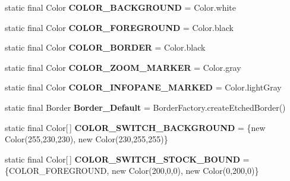 \begin{DoxyCompactItemize}
\item 
static final Color {\bfseries C\-O\-L\-O\-R\-\_\-\-B\-A\-C\-K\-G\-R\-O\-U\-N\-D} = Color.\-white\label{interfacedesmoj_1_1extensions_1_1visualization2d_1_1engine_1_1model_grafic_1_1_grafic_ad2f935939abb177571d67801b26e8671}

\item 
static final Color {\bfseries C\-O\-L\-O\-R\-\_\-\-F\-O\-R\-E\-G\-R\-O\-U\-N\-D} = Color.\-black\label{interfacedesmoj_1_1extensions_1_1visualization2d_1_1engine_1_1model_grafic_1_1_grafic_a8a833565800cb5fa563283c049878763}

\item 
static final Color {\bfseries C\-O\-L\-O\-R\-\_\-\-B\-O\-R\-D\-E\-R} = Color.\-black\label{interfacedesmoj_1_1extensions_1_1visualization2d_1_1engine_1_1model_grafic_1_1_grafic_a5faee3889bc3d33f01b81112f79fd501}

\item 
static final Color {\bfseries C\-O\-L\-O\-R\-\_\-\-Z\-O\-O\-M\-\_\-\-M\-A\-R\-K\-E\-R} = Color.\-gray\label{interfacedesmoj_1_1extensions_1_1visualization2d_1_1engine_1_1model_grafic_1_1_grafic_ac9358ec23ddfdf8512d9bb0e6d695037}

\item 
static final Color {\bfseries C\-O\-L\-O\-R\-\_\-\-I\-N\-F\-O\-P\-A\-N\-E\-\_\-\-M\-A\-R\-K\-E\-D} = Color.\-light\-Gray\label{interfacedesmoj_1_1extensions_1_1visualization2d_1_1engine_1_1model_grafic_1_1_grafic_aa0a85ab169c228c4f3cfdc4094ff4ac1}

\item 
static final Border {\bfseries Border\-\_\-\-Default} = Border\-Factory.\-create\-Etched\-Border()\label{interfacedesmoj_1_1extensions_1_1visualization2d_1_1engine_1_1model_grafic_1_1_grafic_a6786d74d1d6e88db8a7fcaf475f8de8f}

\item 
static final Color[$\,$] {\bfseries C\-O\-L\-O\-R\-\_\-\-S\-W\-I\-T\-C\-H\-\_\-\-B\-A\-C\-K\-G\-R\-O\-U\-N\-D} = \{new Color(255,230,230), new Color(230,255,255)\}\label{interfacedesmoj_1_1extensions_1_1visualization2d_1_1engine_1_1model_grafic_1_1_grafic_ad070a060c50aed2f16236af5afd12197}

\item 
static final Color[$\,$] {\bfseries C\-O\-L\-O\-R\-\_\-\-S\-W\-I\-T\-C\-H\-\_\-\-S\-T\-O\-C\-K\-\_\-\-B\-O\-U\-N\-D} = \{C\-O\-L\-O\-R\-\_\-\-F\-O\-R\-E\-G\-R\-O\-U\-N\-D, new Color(200,0,0), new Color(0,200,0)\}\label{interfacedesmoj_1_1extensions_1_1visualization2d_1_1engine_1_1model_grafic_1_1_grafic_a202b4526b6bbf4339e690aa8da2cc0cf}


\end{DoxyCompactItemize}
